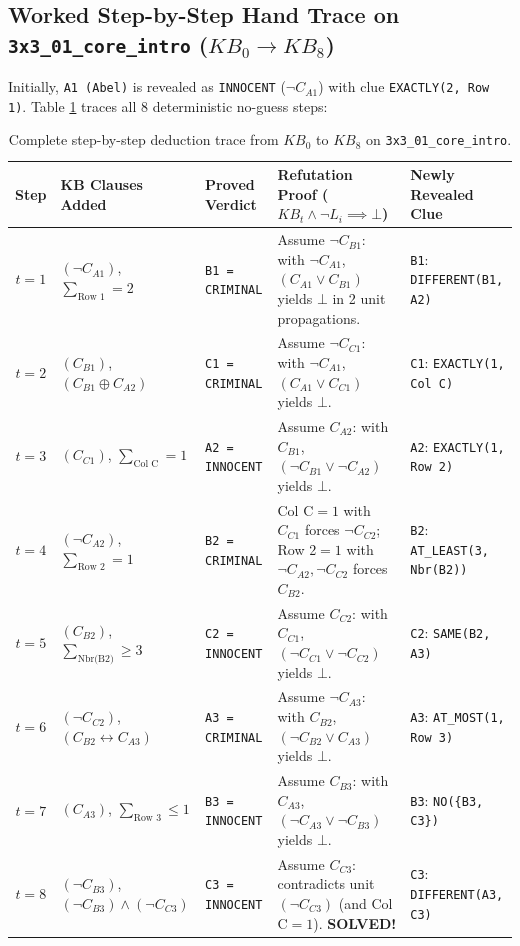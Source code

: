\documentclass[11pt,a4paper]{article}
\begin{document}
\subsection{Worked Step-by-Step Hand Trace on \texttt{3x3\_01\_core\_intro} ($KB_0 \to KB_8$)}
Initially, \texttt{A1 (Abel)} is revealed as \texttt{INNOCENT} ($\neg C_{A1}$) with clue \texttt{EXACTLY(2, Row 1)}. Table \ref{tab:trace} traces all 8 deterministic no-guess steps:

\begin{table}[h!]
\centering
\footnotesize
\begin{tabular}{@{}cllp{5.8cm}p{4.3cm}@{}}
\toprule
\textbf{Step} & \textbf{KB Clauses Added} & \textbf{Proved Verdict} & \textbf{Refutation Proof ($KB_t \land \neg L_i \implies \bot$)} & \textbf{Newly Revealed Clue} \\
\midrule
$t=1$ & $(\neg C_{A1})$, $\sum_{\text{Row }1}=2$ & \texttt{B1 = CRIMINAL} & Assume $\neg C_{B1}$: with $\neg C_{A1}$, $(C_{A1} \lor C_{B1})$ yields $\bot$ in 2 unit propagations. & \texttt{B1}: \texttt{DIFFERENT(B1, A2)} \\
$t=2$ & $(C_{B1})$, $(C_{B1} \oplus C_{A2})$ & \texttt{C1 = CRIMINAL} & Assume $\neg C_{C1}$: with $\neg C_{A1}$, $(C_{A1} \lor C_{C1})$ yields $\bot$. & \texttt{C1}: \texttt{EXACTLY(1, Col C)} \\
$t=3$ & $(C_{C1})$, $\sum_{\text{Col C}}=1$ & \texttt{A2 = INNOCENT} & Assume $C_{A2}$: with $C_{B1}$, $(\neg C_{B1} \lor \neg C_{A2})$ yields $\bot$. & \texttt{A2}: \texttt{EXACTLY(1, Row 2)} \\
$t=4$ & $(\neg C_{A2})$, $\sum_{\text{Row }2}=1$ & \texttt{B2 = CRIMINAL} & Col C$=1$ with $C_{C1}$ forces $\neg C_{C2}$; Row 2$=1$ with $\neg C_{A2}, \neg C_{C2}$ forces $C_{B2}$. & \texttt{B2}: \texttt{AT\_LEAST(3, Nbr(B2))} \\
$t=5$ & $(C_{B2})$, $\sum_{\text{Nbr(B2)}} \ge 3$ & \texttt{C2 = INNOCENT} & Assume $C_{C2}$: with $C_{C1}$, $(\neg C_{C1} \lor \neg C_{C2})$ yields $\bot$. & \texttt{C2}: \texttt{SAME(B2, A3)} \\
$t=6$ & $(\neg C_{C2})$, $(C_{B2} \leftrightarrow C_{A3})$ & \texttt{A3 = CRIMINAL} & Assume $\neg C_{A3}$: with $C_{B2}$, $(\neg C_{B2} \lor C_{A3})$ yields $\bot$. & \texttt{A3}: \texttt{AT\_MOST(1, Row 3)} \\
$t=7$ & $(C_{A3})$, $\sum_{\text{Row }3} \le 1$ & \texttt{B3 = INNOCENT} & Assume $C_{B3}$: with $C_{A3}$, $(\neg C_{A3} \lor \neg C_{B3})$ yields $\bot$. & \texttt{B3}: \texttt{NO(\{B3, C3\})} \\
$t=8$ & $(\neg C_{B3})$, $(\neg C_{B3}) \land (\neg C_{C3})$ & \texttt{C3 = INNOCENT} & Assume $C_{C3}$: contradicts unit $(\neg C_{C3})$ (and Col C$=1$). \textbf{SOLVED!} & \texttt{C3}: \texttt{DIFFERENT(A3, C3)} \\
\bottomrule
\end{tabular}
\caption{Complete step-by-step deduction trace from $KB_0$ to $KB_8$ on \texttt{3x3\_01\_core\_intro}.}
\label{tab:trace}
\end{table}
\end{document}
